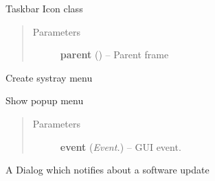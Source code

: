 \documentclass[letterpaper,10pt,english]{sphinxmanual}
\begin{document}
\begin{fulllineitems}
\label{api:wos.SysTray}
Taskbar Icon class
\begin{quote}\begin{description}
\item[{Parameters}] \leavevmode
\textbf{parent} () -- Parent frame

\end{description}\end{quote}

\begin{fulllineitems}
\label{api:wos.SysTray.CreateMenu}
Create systray menu

\end{fulllineitems}


\begin{fulllineitems}
\label{api:wos.SysTray.ShowMenu}
Show popup menu
\begin{quote}\begin{description}
\item[{Parameters}] \leavevmode
\textbf{event} (\emph{Event.}) -- GUI event.

\end{description}\end{quote}

\end{fulllineitems}


\end{fulllineitems}


\begin{fulllineitems}
\label{api:wos.UpdateDialog}
A Dialog which notifies about a software update

\end{fulllineitems}

\end{document}
